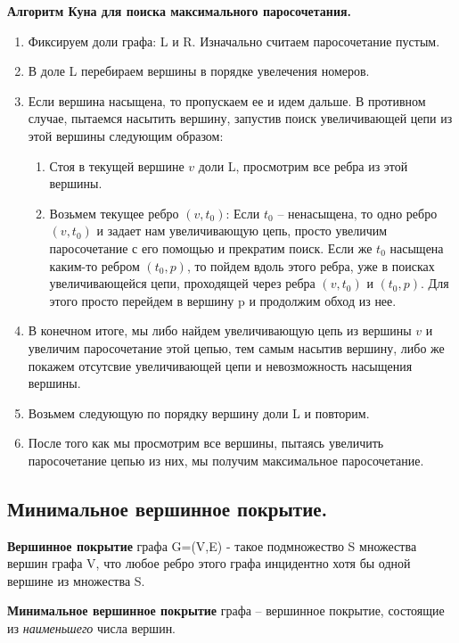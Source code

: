 \textbf{Алгоритм Куна для поиска максимального паросочетания.}
\begin{enumerate}
	\item Фиксируем доли графа: L и R. Изначально считаем паросочетание пустым. 
	\item В доле L перебираем вершины в порядке увелечения номеров.
	\item Если вершина насыщена, то пропускаем ее и идем дальше.
В противном случае, пытаемся насытить вершину, запустив поиск увеличивающей цепи из этой вершины следующим образом: 
	\begin{enumerate}
		\item Стоя в текущей вершине $v$ доли L, просмотрим все ребра из этой вершины.
		\item Возьмем текущее ребро $(v, t_0)$: 
Если $t_0$ -- ненасыщена, то одно ребро $(v, t_0)$ и задает нам увеличивающую цепь, просто увеличим паросочетание с его помощью и прекратим поиск.
Если же $t_0$ насыщена каким-то ребром  $(t_0, p)$, то пойдем вдоль этого ребра, уже в поисках увеличивающейся цепи, проходящей через ребра $(v, t_0)$ и  $(t_0, p)$. Для этого просто перейдем в вершину p и продолжим обход из нее.
	\end{enumerate}
\item В конечном итоге, мы либо найдем увеличивающую цепь из вершины $v$ и увеличим паросочетание этой цепью, тем самым насытив вершину, либо же покажем отсутсвие увеличивающей цепи и невозможность насыщения вершины.
\item Возьмем следующую по порядку вершину доли L и повторим.
\item После того как мы просмотрим все вершины, пытаясь увеличить паросочетание цепью из них, мы получим максимальное паросочетание.
\end{enumerate}

\subsection*{Минимальное вершинное покрытие.}%
\label{sub:Минимальное вершинное покрытие.}

\begin{Def}
	\textbf{Вершинное покрытие} графа G=(V,E)  - такое подмножество S множества вершин графа V, что любое ребро этого графа инцидентно хотя бы одной вершине из множества S.
\end{Def}

\begin{Def}
	\textbf{Минимальное вершинное покрытие} графа -- вершинное покрытие, состоящие из \textit{наименьшего} числа вершин.
\end{Def}

